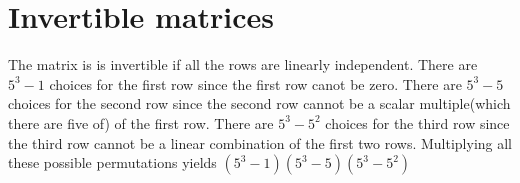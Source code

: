 \section{Invertible matrices}
The matrix is is invertible if all the rows are linearly independent.
There are $5^3 - 1$ choices for the first row since the first row canot be zero.
There are $5^3 - 5$ choices for the second row 
since the second row cannot be a scalar multiple(which there are five of) of the first row.
There are $5^3 - 5^2$ choices for the third row since the third row cannot be a linear
combination of the first two rows. 
Multiplying all these possible permutations yields $(5^3-1)(5^3-5)(5^3-5^2)$